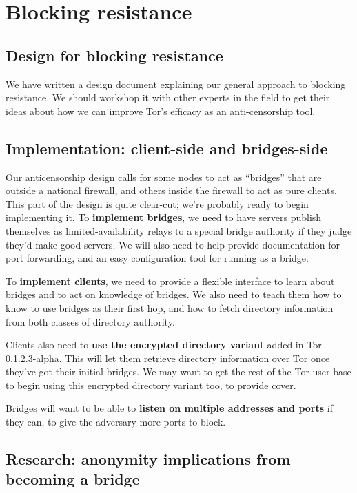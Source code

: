 \documentclass{article}
\begin{document}
\section{Blocking resistance}

\subsection{Design for blocking resistance}
We have written a design document explaining our general approach to blocking
resistance.  We should workshop it with other experts in the field to get
their ideas about how we can improve Tor's efficacy as an anti-censorship
tool.

\subsection{Implementation: client-side and bridges-side}

Our anticensorship design calls for some nodes to act as ``bridges''
that are outside a national firewall, and others inside the firewall to
act as pure clients.  This part of the design is quite clear-cut; we're
probably ready to begin implementing it.  To {\bf implement bridges}, we
need to have servers publish themselves as limited-availability relays
to a special bridge authority if they judge they'd make good servers.
We will also need to help provide documentation for port forwarding,
and an easy configuration tool for running as a bridge.

To {\bf implement clients}, we need to provide a flexible interface to
learn about bridges and to act on knowledge of bridges. We also need
to teach them how to know to use bridges as their first hop, and how to
fetch directory information from both classes of directory authority.

Clients also need to {\bf use the encrypted directory variant} added in Tor
0.1.2.3-alpha.  This will let them retrieve directory information over Tor
once they've got their initial bridges. We may want to get the rest of the
Tor user base to begin using this encrypted directory variant too, to
provide cover.

Bridges will want to be able to {\bf listen on multiple addresses and ports}
if they can, to give the adversary more ports to block.

\subsection{Research: anonymity implications from becoming a bridge}
\end{document}

